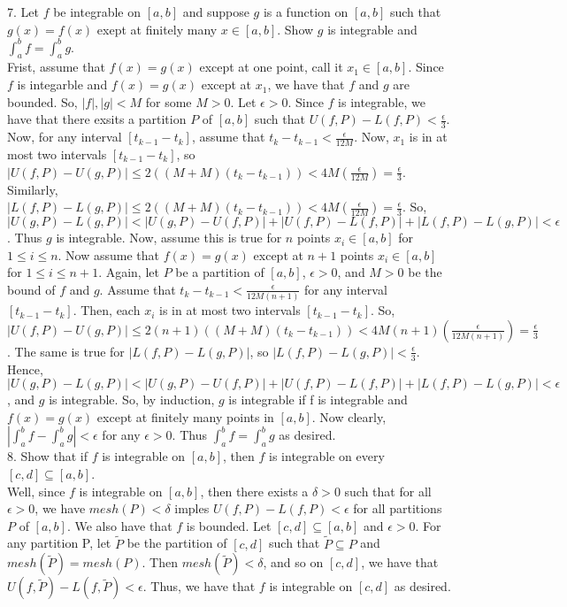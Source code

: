 \documentclass[12pt]{article}
\begin{document}
7. Let $f$ be integrable on $[a,b]$ and suppose $g$ is a function on $[a,b]$ such that $g(x)=f(x)$ exept at finitely many $x\in[a,b]$. Show $g$ is integrable and $\int_a^bf=\int_a^bg$.\\
Frist, assume that $f(x)=g(x)$ except at one point, call it $x_1\in[a,b]$. Since $f$ is integarble and $f(x)=g(x)$ except at $x_1$, we have that $f$ and $g$ are bounded. So, $|f|, |g|<M$ for some $M>0$. Let $\epsilon>0$. Since $f$ is integrable, we have that there exsits a partition $P$ of $[a,b]$ such that $U(f,P)-L(f,P)<\frac{\epsilon}{3}$. Now, for any interval $[t_{k-1}-t_k]$, assume that $t_k-t_{k-1}<\frac{\epsilon}{12M}$. Now, $x_1$ is in at most two intervals $[t_{k-1}-t_k]$, so $|U(f,P)-U(g,P)|\leq2((M+M)(t_k-t_{k-1}))<4M(\frac{\epsilon}{12M})=\frac{\epsilon}{3}$. Similarly, $|L(f,P)-L(g,P)|\leq2((M+M)(t_k-t_{k-1}))<4M(\frac{\epsilon}{12M})=\frac{\epsilon}{3}$. So, $|U(g,P)-L(g,P)|<|U(g,P)-U(f,P)|+|U(f,P)-L(f,P)|+|L(f,P)-L(g,P)|<\epsilon$. Thus $g$ is integrable. Now, assume this is true for $n$ points $x_i\in[a,b]$ for $1\leq i\leq n$. Now assume that $f(x)=g(x)$ except at $n+1$ points $x_i\in[a,b]$ for $1\leq i\leq n+1$. Again, let $P$ be a partition of $[a,b]$, $\epsilon>0$, and $M>0$ be the bound of $f$ and $g$. Assume that $t_k-t_{k-1}<\frac{\epsilon}{12M(n+1)}$ for any interval $[t_{k-1}-t_k]$. Then, each $x_i$ is in at most two intervals $[t_{k-1}-t_k]$. So, $|U(f,P)-U(g,P)|\leq2(n+1)((M+M)(t_k-t_{k-1}))<4M(n+1)(\frac{\epsilon}{12M(n+1)})=\frac{\epsilon}{3}$. The same is true for $|L(f,P)-L(g,P)|$, so $|L(f,P)-L(g,P)|<\frac{\epsilon}{3}$. Hence, $|U(g,P)-L(g,P)|<|U(g,P)-U(f,P)|+|U(f,P)-L(f,P)|+|L(f,P)-L(g,P)|<\epsilon$, and $g$ is integrable. So, by induction, $g$ is integrable if f is integrable and $f(x)=g(x)$ except at finitely many points in $[a,b]$. Now clearly, $|\int_a^bf-\int_a^bg|<\epsilon$ for any $\epsilon>0$. Thus $\int_a^bf=\int_a^bg$ as desired.\\[20pt]

8. Show that if $f$ is integrable on $[a,b]$, then $f$ is integrable on every $[c,d]\subseteq[a,b]$.\\
Well, since $f$ is integrable on $[a,b]$, then there exists a $\delta>0$ such that for all $\epsilon>0$, we have $mesh(P)<\delta$ imples $U(f,P)-L(f,P)<\epsilon$ for all partitions $P$ of $[a,b]$. We also have that $f$ is bounded. Let $[c,d]\subseteq[a,b]$ and $\epsilon>0$. For any partition P, let $\tilde{P}$ be the partition of $[c,d]$ such that $\tilde{P}\subseteq P$ and $mesh(\tilde{P})=mesh(P)$. Then $mesh(\tilde{P})<\delta$, and so on $[c,d]$, we have that $U(f,\tilde{P})-L(f,\tilde{P})<\epsilon$. Thus, we have that $f$ is integrable on $[c,d]$ as desired.
\end{document}
